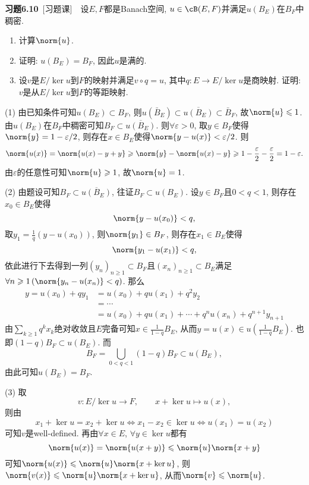 	\textbf{习题6.10}\ [习题课]\ \ 设$ E, F $都是Banach空间, $ u\in\cB(E,F) $并满足$ u(B_E) $在$ B_F $中稠密.
	\begin{enumerate}
	\item 计算$ \norm{u} $.
	\item 证明: $ u(B_E)=B_F $, 因此$ u $是满的.
	\item 设$ v $是$ E/\ker u $到$ F $的映射并满足$ v\circ q=u $, 其中$ q : E\to E/\ker u $是商映射. 证明: $ v $是从$ E/\ker u $到$ F $的等距映射.
	\end{enumerate}
	\begin{answer}
	(1) 由已知条件可知$ u(B_E)\subset B_F $, 则$ u(\bar{B}_E)\subset\overline{u(B_E)}\subset \bar{B}_F $, 故$ \norm{u}\leqslant 1 $. 由$ u(B_E) $在$ B_F $中稠密可知$ B_F\subset\overline{u(B_E)} $. 则$ \forall\varepsilon>0 $, 取$ y\in B_F $使得$ \norm{y}=1-\varepsilon/2 $, 则存在$ x\in B_E $使得$ \norm{y-u(x)}<\varepsilon/2 $. 则
	\[
	\norm{u(x)}=\norm{u(x)-y+y}\geqslant\norm{y}-\norm{u(x)-y}\geqslant 1-\frac{\varepsilon}{2}-\frac{\varepsilon}{2}=1-\varepsilon.
	\]
	由$ \varepsilon $的任意性可知$ \norm{u}\geqslant 1 $, 故$ \norm{u}=1 $.
	
	(2) 由题设可知$ B_F\subset\overline{u(B_E)} $, 往证$ B_F\subset u(B_E) $. 设$ y\in B_F $且$ 0<q<1 $, 则存在$ x_0\in B_E $使得
	\[
	\norm{y-u(x_0)}<q,
	\]
	取$ y_1=\frac{1}{q}(y-u(x_0)) $, 则$ \norm{y_1}\in B_F $, 则存在$ x_1\in B_E $使得
	\[
	\norm{y_1-u(x_1)}<q,
	\]
	依此进行下去得到一列$ (y_n)_{n\geqslant 1}\subset B_F $且$ (x_n)_{n\geqslant 1}\subset B_E $满足$ \forall n\geqslant 1\,(\norm{y_n-u(x_n)}<q) $. 那么
	\[
	\begin{aligned}
	y=u(x_0)+qy_1&=u(x_0)+qu(x_1)+q^2y_2\\
	&=\cdots\\
	&=u(x_0)+qu(x_1)+\cdots+q^nu(x_n)+q^{n+1}y_{n+1}
	\end{aligned}
	\]
	由$ \sum\limits_{k\geqslant 1}q^kx_k $绝对收敛且$ E $完备可知$ x\in\frac{1}{1-q}B_E $, 从而$ y=u(x)\in u\left( \frac{1}{1-q}B_E \right) $. 也即$ (1-q)B_F\subset u(B_E) $. 而
	\[
	B_F=\bigcup_{0<q<1}(1-q)B_F\subset u(B_E),
	\]
	由此可知$ u(B_E)=B_F $.
	
	(3) 取
	\[
	v : E/\ker u\to F,\qquad x+\ker u\mapsto u(x),
	\]
	则由
	\[
	x_1+\ker u=x_2+\ker u\Longleftrightarrow x_1-x_2\in\ker u\Longleftrightarrow u(x_1)=u(x_2)
	\]
	可知$ v $是well-defined. 再由$ \forall x\in E $, $ \forall y\in\ker u $都有
	\[
	\norm{u(x)}=\norm{u(x+y)}\leqslant\norm{u}\norm{x+y}
	\]
	可知$ \norm{u(x)}\leqslant\norm{u}\norm{x+\ker u} $, 则$ \norm{v(x)}\leqslant\norm{u}\norm{x+\ker u} $, 从而$ \norm{v}\leqslant\norm{u} $.
	

\end{answer}
